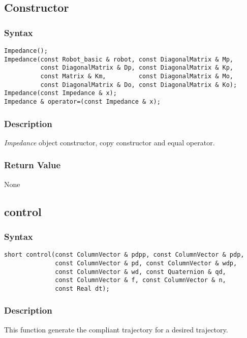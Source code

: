 \documentclass[11pt,fleqn,letterpaper]{report}
\begin{document}
\subsection*{Constructor}
\subsubsection*{Syntax}
\begin{verbatim}
Impedance();
Impedance(const Robot_basic & robot, const DiagonalMatrix & Mp, 
          const DiagonalMatrix & Dp, const DiagonalMatrix & Kp, 
          const Matrix & Km,         const DiagonalMatrix & Mo, 
          const DiagonalMatrix & Do, const DiagonalMatrix & Ko);
Impedance(const Impedance & x);
Impedance & operator=(const Impedance & x);
\end{verbatim}

\subsubsection*{Description}   
\emph{Impedance} object constructor, copy constructor and equal
operator.

\subsubsection*{Return Value}

None

\newpage

\subsection*{control}
\subsubsection*{Syntax}
\begin{verbatim}
short control(const ColumnVector & pdpp, const ColumnVector & pdp,
              const ColumnVector & pd, const ColumnVector & wdp,
              const ColumnVector & wd, const Quaternion & qd, 
              const ColumnVector & f, const ColumnVector & n,
              const Real dt); 
\end{verbatim}

\subsubsection*{Description}   
This function generate the compliant trajectory for a desired
trajectory.
\end{document}
